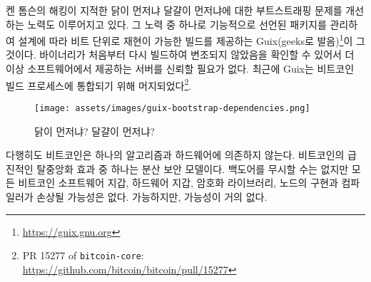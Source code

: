 \begin{comment}
Various efforts are being made to improve upon the chicken-and-egg problem of
bootstrapping which Ken Thompson's hack so brilliantly pointed
out~\cite{web:bootstrapping}. One such effort is
Guix\footnote{\url{https://guix.gnu.org}} (pronounced \textit{geeks}), which
uses functionally declared package management leading to bit-for-bit
reproducible builds by design. The result is that you don't have to trust any
software-providing servers anymore since you can verify that the served binary
was not tampered with by rebuilding it from scratch. Recently, a
pull-request was merged to integrate Guix into the Bitcoin build process.\footnote{See PR 15277 of \texttt{bitcoin-core}: \\ \url{https://github.com/bitcoin/bitcoin/pull/15277}}
\end{comment}
켄 톰슨의 해킹이 지적한 닭이 먼저냐 달걀이 먼저냐에 대한 부트스트래핑 문제를 개선하는 노력도 이루어지고 있다\cite{web:bootstrapping}.
그 노력 중 하나로 기능적으로 선언된 패키지를 관리하여 설계에 따라 비트 단위로 재현이 가능한 빌드를 제공하는 Guix(geeks로 발음)\footnote{\url{https://guix.gnu.org}}이 그것이다.
바이너리가 처음부터 다시 빌드하여 변조되지 않았음을 확인할 수 있어서 더 이상 소프트웨어에서 제공하는 서버를 신뢰할 필요가 없다.
최근에 Guix는 비트코인 빌드 프로세스에 통합되기 위해 머지되었다\footnote{PR 15277 of \texttt{bitcoin-core}: \\ \url{https://github.com/bitcoin/bitcoin/pull/15277}}.

\begin{figure}
  \texttt{[image: assets/images/guix-bootstrap-dependencies.png]}
  \caption{닭이 먼저냐? 달걀이 먼저냐?}
  \label{fig:guix-bootstrap-dependencies}
\end{figure}

\begin{comment}
Luckily, Bitcoin doesn't rely on a single algorithm or piece of
hardware. One effect of Bitcoin's radical decentralization is a
distributed security model. Although the backdoors described above are
not to be taken lightly, it is unlikely that every software wallet,
every hardware wallet, every cryptographic library, every node
implementation, and every compiler of every language is compromised.
Possible, but highly unlikely.
\end{comment}
다행히도 비트코인은 하나의 알고리즘과 하드웨어에 의존하지 않는다.
비트코인의 급진적인 탈중앙화 효과 중 하나는 분산 보안 모델이다. 
백도어를 무시할 수는 없지만 모든 비트코인 소프트웨어 지갑, 하드웨어 지갑, 
암호화 라이브러리, 노드의 구현과 컴파일러가 손상될 가능성은 없다.
가능하지만, 가능성이 거의 없다.


